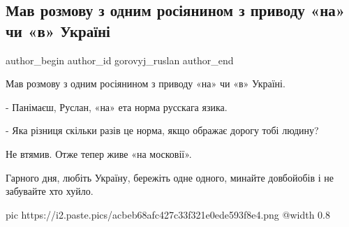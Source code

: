  
 
 
 
 
 
\subsection{Мав розмову з одним росіянином з приводу «на» чи «в» Україні}
\label{sec:10_12_2021.fb.gorovyj_ruslan.1.vna_ukraine}
 
\ifcmt
 author_begin
   author_id gorovyj_ruslan
 author_end
\fi

Мав розмову з одним росіянином з приводу «на» чи «в» Україні.

- Панімаєш, Руслан, «на» ета норма русскага язика. 

- Яка різниця скільки разів це норма, якщо ображає дорогу тобі людину?

Не втямив. Отже тепер живе «на московії».

Гарного дня, любіть Україну, бережіть одне одного, минайте довбойобів і не
забувайте хто хуйло.

\ifcmt
	pic https://i2.paste.pics/acbeb68afc427c33f321e0ede593f8e4.png
  @width 0.8
\fi

